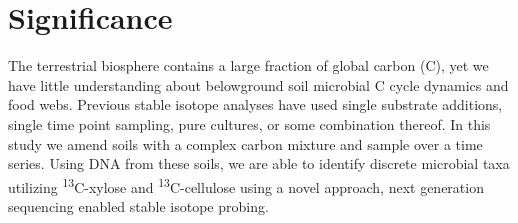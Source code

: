 \section{Significance} 
The terrestrial biosphere contains a large fraction of global carbon (C), yet we have little understanding about belowground soil microbial C cycle dynamics and food webs. Previous stable isotope analyses have used single substrate additions, single time point sampling, pure cultures, or some combination thereof.  In this study we amend soils with a complex carbon mixture and sample over a time series. Using DNA from these soils, we are able to identify discrete microbial taxa utilizing \textsuperscript{13}C-xylose and \textsuperscript{13}C-cellulose using a novel approach, next generation sequencing enabled stable isotope probing.    
 
